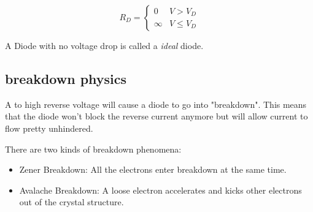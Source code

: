 \documentclass[11ypt]{extarticle}
\begin{document}
\begin{equation}
    R_D = 
    \begin{cases}
        {0} & {V > V_D} \\
        {\infty} & {V \leq V_D}
    \end{cases}      
\end{equation}

A Diode with no voltage drop is called a \textit{ideal} diode.

\subsection{breakdown physics}

A to high reverse voltage will cause a diode to go into "breakdown". This means that the diode won't block the reverse current anymore but will allow current to flow pretty unhindered.


There are two kinds of breakdown phenomena:
\begin{itemize}
	\item Zener Breakdown: All the electrons enter breakdown at the same time.
	\item Avalache Breakdown: A loose electron accelerates and kicks other electrons out of the crystal structure.
\end{itemize}
\end{document}
